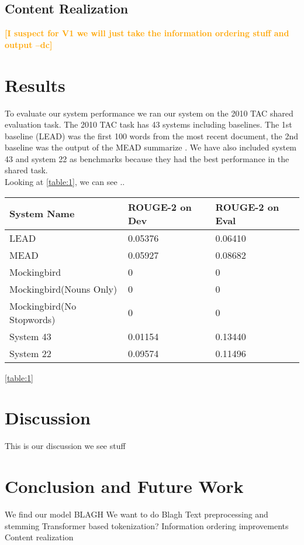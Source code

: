 \documentclass[11pt,a4paper]{article}
\newcommand{\spacemanidol}[1]{\textcolor{orange}{\bf \small [#1 --dc]}}
\begin{document}
\subsection{Content Realization}
\spacemanidol{I suspect for V1 we will just take the information ordering stuff and output}
\section{Results}
To evaluate our system performance we ran our system on the 2010 TAC shared evaluation task. The 2010 TAC task has 43 systems including baselines. The 1st baseline (LEAD) was the first 100 words from the most recent document, the 2nd baseline was the output of the MEAD summarize \cite{Radev2003MEADRM}. We have also included system 43 and system 22 as benchmarks because they had the best performance in the shared task. \\
Looking at \ref{table:1}, we can see ..
\begin{table}[h!]
\begin{tabular}{|l|l|l|} \hline
\textbf{System Name} & \textbf{ROUGE-2 on Dev} & \textbf{ROUGE-2 on Eval} \\ \hline
LEAD & 0.05376 & 0.06410 \\ \hline
MEAD & 0.05927 & 0.08682\\ \hline
Mockingbird & 0 & 0 \\ \hline
Mockingbird(Nouns Only) &  0 &  0\\ \hline
Mockingbird(No Stopwords) & 0 & 0 \\ \hline
System 43 & 0.01154 & 0.13440 \\ \hline
System 22 & 0.09574 & 0.11496 \\ \hline
\end{tabular}
\ref{table:1}
\end{table}
\section{Discussion}
This is our discussion we see stuff
\section{Conclusion and Future Work}
We find our model BLAGH
We want to do Blagh
Text preprocessing and stemming
Transformer based tokenization?
Information ordering improvements
Content realization


\end{document}
